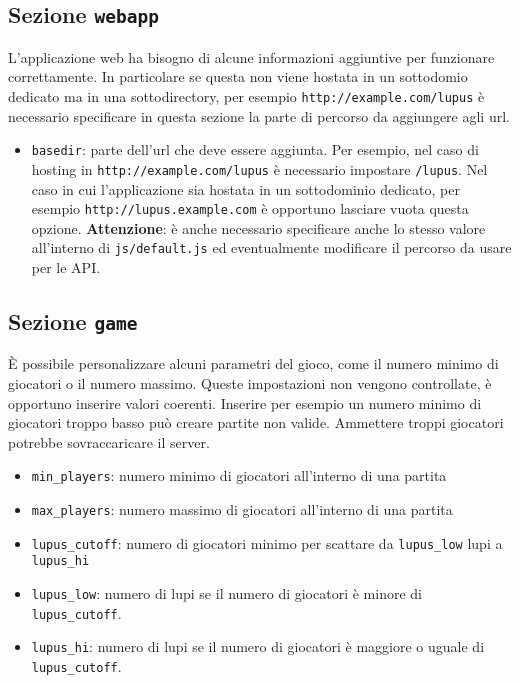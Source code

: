 \subsection{Sezione \texttt{webapp}}

L'applicazione web ha bisogno di alcune informazioni aggiuntive per funzionare correttamente. In particolare se questa non viene hostata in un sottodomio dedicato ma in una sottodirectory, per esempio \texttt{http://example.com/lupus} è necessario specificare in questa sezione la parte di percorso da aggiungere agli url.

\begin{itemize}
	\item \texttt{basedir}: parte dell'url che deve essere aggiunta. Per esempio, nel caso di hosting in \texttt{http://example.com/lupus} è necessario impostare \texttt{/lupus}. Nel caso in cui l'applicazione sia hostata in un sottodominio dedicato, per esempio \texttt{http://lupus.example.com} è opportuno lasciare vuota questa opzione. \textbf{Attenzione}: è anche necessario specificare anche lo stesso valore all'interno di \texttt{js/default.js} ed eventualmente modificare il percorso da usare per le API.
\end{itemize}


\subsection{Sezione \texttt{game}}

È possibile personalizzare alcuni parametri del gioco, come il numero minimo di giocatori o il numero massimo. Queste impostazioni non vengono controllate, è opportuno inserire valori coerenti. Inserire per esempio un numero minimo di giocatori troppo basso può creare partite non valide. Ammettere troppi giocatori potrebbe sovraccaricare il server.

\begin{itemize}
	\item \texttt{min\_players}: numero minimo di giocatori all'interno di una partita
	\item \texttt{max\_players}: numero massimo di giocatori all'interno di una partita
	\item \texttt{lupus\_cutoff}: numero di giocatori minimo per scattare da \texttt{lupus\_low} lupi a \texttt{lupus\_hi}
	\item \texttt{lupus\_low}: numero di lupi se il numero di giocatori è minore di \texttt{lupus\_cutoff}.
	\item \texttt{lupus\_hi}: numero di lupi se il numero di giocatori è maggiore o uguale di \texttt{lupus\_cutoff}.
\end{itemize}